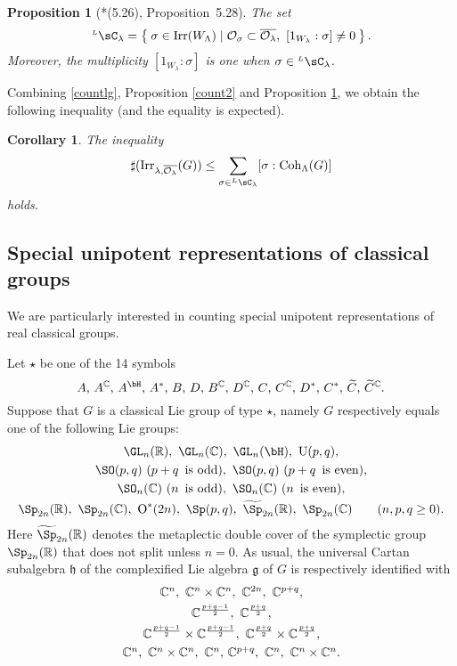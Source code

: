 \documentclass[12pt,a4paper]{amsart}
\newcommand{\CO}{{\mathcal {O}}}
\newcommand{\oO}{\operatorname{O}}
\newcommand{\oU}{\operatorname{U}}
\newcommand{\g}{\mathfrak g}
\newcommand{\h}{\mathfrak h}
\newcommand{\R}{\mathbb R}
\numberwithin{equation}{section}
\newtheorem{prop}[thm]{Proposition}
\newtheorem{cor}[thm]{Corollary}
\theoremstyle{remark}
\def\Irr{\mathrm{Irr}}
\def\LC{{}^{\scriptscriptstyle L}\sC}
\def\Coh{\mathrm{Coh}}
\begin{document}
 \begin{prop}[{\cite{BVUni}*{(5.26), Proposition~5.28}}]\label{lem:lcell.BV0}
 The set
 \[
    \LC_{\lambda} = \Set{\sigma\in  \Irr(W_\Lambda)\mid \CO_\sigma\subset \overline{\CO_\lambda}, \    [1_{W_{\lambda}}:\sigma]\neq 0}.
   \]
  Moreover, the multiplicity $[1_{W_{\lambda}}:\sigma]$ is one
  when $\sigma\in \LC_\lambda$.
\end{prop}

Combining \eqref{countlg}, Proposition \ref{count2}
and Proposition \ref{lem:lcell.BV0}, we obtain the following inequality (and the equality is expected).

\begin{cor}
 The inequality 
  \begin{equation}\label{boundc}
    \sharp(\Irr_{\lambda,\overline{\CO_\lambda}}(G)) \leq \sum_{\sigma\in \LC_\lambda} [\sigma: \Coh_{\Lambda}(G)]
  \end{equation}
  holds. 
\end{cor}



\subsection{Special unipotent representations of classical groups}

We are particularly interested in counting special unipotent representations of  real classical groups.  

Let $\star$ be one of the  14 symbols
\[
\textrm{ $A$, $A^\C$, $A^\bH$, $A^*$, $B$, $D$,   $B^\C$, $D^\C$, $C$, $C^\C$, $D^*$, $C^*$, $\widetilde C$, $\widetilde C^\C$. }
\]
Suppose that $G$ is a classical Lie group of type $\star$, namely $G$ respectively equals 
one of the following Lie groups:
\[
\begin{array}{c}
   \GL_n(\R), \ \GL_n(\C), \  \GL_n(\bH),\  \oU(p,q),\smallskip\\
    \SO(p,q)\ (p+q\, \textrm{ is odd}),  \  \SO(p,q)\  (p+q\, \textrm{ is even}),\smallskip\\  
     \SO_n(\C) \ (n\, \textrm{ is odd}),  \ 
     \SO_n(\C) \ (n\, \textrm{ is even}),\smallskip \\
     \Sp_{2n}(\R), \ \Sp_{2n}(\C), \  \oO^*(2n), \  \Sp(p,q),\   \widetilde \Sp_{2n}(\R), \ \Sp_{2n}(\C) \qquad (n, p, q\geq 0).
     \end{array}
\]
Here $\widetilde \Sp_{2n}(\R)$ denotes the metaplectic double cover of the symplectic group $\Sp_{2n}(\R)$ that does not split unless $n=0$. 
As usual, the universal Cartan subalgebra $\h$ of 
 the complexified Lie algebra $\g$ of $G$ is respectively identified with
\[
\begin{array}{c}
  \C^n, \ \C^n\times \C^n, \ \C^{2n},  \ \C^{p+q},\smallskip \\
\C^{\frac{p+q-1}{2}},\ \C^{\frac{p+q}{2}}, \smallskip \\
\C^{\frac{p+q-1}{2}}\times \C^{\frac{p+q-1}{2}},\  \C^{\frac{p+q}{2}}\times \C^{\frac{p+q}{2}}, \smallskip \\
\C^n,\ \C^n\times \C^n, \ \C^n, \, \C^{p+q},   \ \C^n,\ \C^n\times \C^n.
     \end{array}
\]
 
\end{document}
